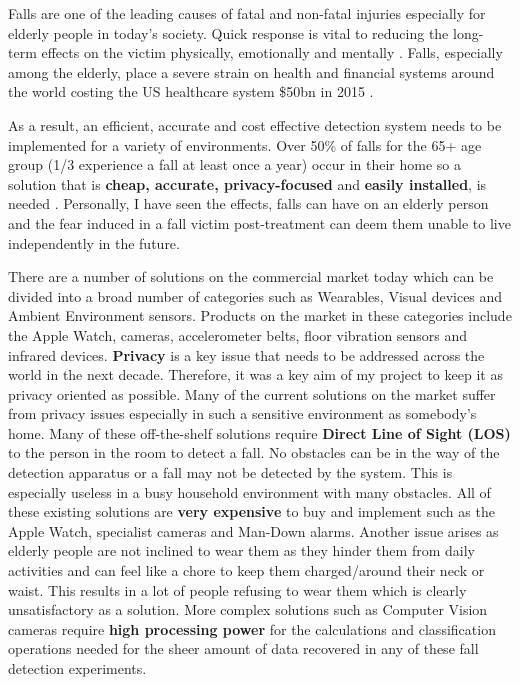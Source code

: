Falls are one of the leading causes of fatal and non-fatal injuries especially for elderly people in today's society. Quick response is vital to reducing the long-term effects on the victim physically, emotionally and mentally \citep{dangerousFalls,stokesFall}. Falls, especially among the elderly, place a severe strain on health and financial systems around the world costing the US healthcare system \$50bn in 2015 \citep{medicalFall}.\par
As a result, an efficient, accurate and cost effective detection system needs to be implemented for a variety of environments. Over 50\% of falls for the 65+ age group (1/3 experience a fall at least once a year) occur in their home so a solution that is \textbf{cheap, accurate, privacy-focused} and \textbf{easily installed}, is needed \citep{medicalFall, stokesFall}. 
Personally, I have seen the effects, falls can have on an elderly person and the fear induced in a fall victim post-treatment can deem them unable to live independently in the future. \citep{fearFall} \par
There are a number of solutions on the commercial market today which can be divided into a broad number of categories such as Wearables, Visual devices and Ambient Environment sensors. Products on the market in these categories include the Apple Watch, cameras, accelerometer belts, floor vibration sensors and infrared devices. \textbf{Privacy} is a key issue that needs to be addressed across the world in the next decade. Therefore, it was a key aim of my project to keep it as privacy oriented as possible. Many of the current solutions on the market suffer from privacy issues especially in such a sensitive environment as somebody's home. Many of these off-the-shelf solutions require \textbf{Direct Line of Sight (LOS)} to the person in the room to detect a fall. No obstacles can be in the way of the detection apparatus or a fall may not be detected by the system. This is especially useless in a busy household environment with many obstacles. All of these existing solutions are \textbf{very expensive} to buy and implement such as the Apple Watch, specialist cameras and Man-Down alarms. Another issue arises as elderly people are not inclined to wear them as they hinder them from daily activities and can feel like a chore to keep them charged/around their neck or waist. This results in a lot of people refusing to wear them which is clearly unsatisfactory as a solution. More complex solutions such as Computer Vision cameras require \textbf{high processing power} for the calculations and classification operations needed for the sheer amount of data recovered in any of these fall detection experiments. \par

